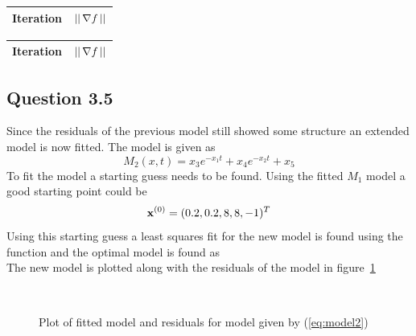 \begin{tabular}{c c}
    Iteration & $||\,\nabla f\,||$ \\\hline
    
\end{tabular}
\begin{tabular}{c c}
    Iteration & $||\,\nabla f\,||$ \\\hline
    
\end{tabular}

\subsection*{Question 3.5}
Since the residuals of the previous model still showed some structure an extended model is now fitted. The model is given as
\begin{equation}\label{eq:model2}
    M_2(x, t) = x_3 e^{-x_1t} + x_4 e^{-x_2 t} + x_5
\end{equation}
To fit the model a starting guess needs to be found. Using the fitted $M_1$ model a good starting point could be 
\begin{equation*}
    \mathbf{x}^{(0)} = (0.2, 0.2, 8, 8, -1)^T
\end{equation*}
Using this starting guess a least squares fit for the new model is found using the  function and the optimal model is found as
\begin{equation*}
    
\end{equation*}
The new model is plotted along with the residuals of the model in figure~\ref{fig:model2-plots}

\begin{figure}
    \centering
    \mbox{ \quad {}}
    \caption{Plot of fitted model and residuals for model given by (\ref{eq:model2})}
    \label{fig:model2-plots}
\end{figure}

